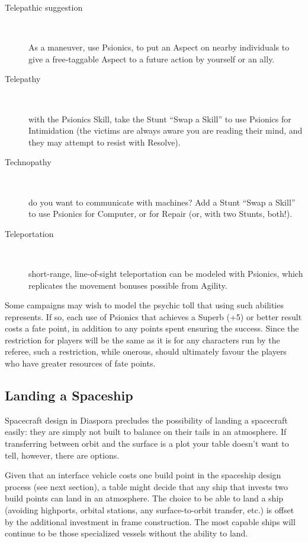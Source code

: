 \begin{description}
\item[Telepathic suggestion] ~

As a maneuver, use Psionics, to put an Aspect on nearby individuals to give a free-taggable Aspect to a future action by yourself or an ally.

\item[Telepathy] ~

with the Psionics Skill, take the  Stunt ``Swap a Skill'' to use Psionics for Intimidation (the victims are always aware you are reading their mind, and they may attempt to resist with Resolve).

\item[Technopathy] ~

do you want to communicate with machines? Add a Stunt ``Swap a Skill'' to use Psionics for Computer, or for Repair (or, with two Stunts, both!).

\item[Teleportation] ~

short-range, line-of-sight teleportation can be modeled with Psionics, which replicates the movement bonuses possible from Agility.
\end{description}


Some campaigns may wish to model the psychic toll that using such abilities represents. If so, each use of Psionics that achieves a Superb (+5) or better result costs a fate point, in addition to any points spent ensuring the success. Since the restriction for players will be the same as it is for any characters run by the referee, such a restriction, while onerous, should ultimately favour the players who have greater resources of fate points.



\subsection{Landing a Spaceship}\label{sec:Landing a Spaceship} %

Spacecraft design in Diaspora precludes the possibility of landing a
spacecraft easily: they are simply not built to balance on their tails
in an atmosphere. If transferring between orbit and the surface is a
plot your table doesn't want to tell, however, there are options.

Given that an interface vehicle costs one build point in the spaceship
design process (see next section), a table might decide that any ship
that invests two build points can land in an atmosphere. The choice to
be able to land a ship (avoiding highports, orbital stations, any
surface-to-orbit transfer, etc.) is offset by the additional
investment in frame construction. The most capable ships will continue
to be those specialized vessels without the ability to land.

